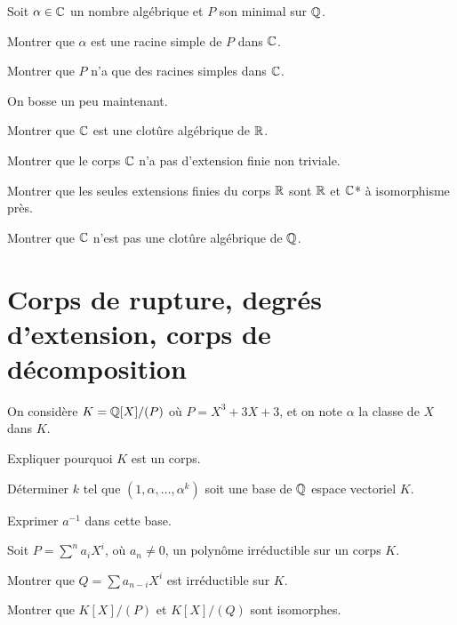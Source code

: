 \documentclass[french]{report}
\begin{document}
\begin{exo}
    Soit \(\alpha\in\mathbb{C}\) un nombre algébrique et \(P\) son
    minimal sur \(\mathbb{Q}\).
    \begin{q}{1}
        Montrer que \(\alpha\) est une racine simple de \(P\) dans \(\mathbb{C}\).
    \end{q}
    \begin{q}{2}
        Montrer que \(P\) n'a que des racines simples dans \(\mathbb{C}\).
    \end{q}
\end{exo}

\begin{exo} On bosse un peu maintenant.
    \begin{q}{1}
        Montrer que \(\mathbb{C}\) est une clotûre algébrique de \(\mathbb{R}\).
    \end{q}
    \begin{q}{2}
        Montrer que le corps \(\mathbb{C}\) n'a pas d'extension finie non triviale.
    \end{q}
    \begin{q}{3}
        Montrer que les seules extensions finies du corps \(\mathbb{R}\) sont \(\mathbb{R}\) et \(\mathbb{C}\)*
        à isomorphisme près.
    \end{q}
    \begin{q}{4}
        Montrer que \(\mathbb{C}\) n'est pas une clotûre algébrique de \(\mathbb{Q}\).
    \end{q}
\end{exo}

\section*{Corps de rupture, degrés d'extension, corps de décomposition}

\begin{exo}
    On considère \(K=\mathbb{Q}[X]/(P)\) où \(P=X^3+3X+3\), et on note \(\alpha\)
    la classe de \(X\) dans \(K\).
    \begin{q}{1}
        Expliquer pourquoi \(K\) est un corps.
    \end{q}
    \begin{q}{2}
        Déterminer \(k\) tel que \(\left(1,\alpha,\dots,\alpha^k\right)\) soit
        une base de \(\mathbb{Q}\) espace vectoriel \(K\).
    \end{q}
    \begin{q}{3}
        Exprimer \(a^{-1}\) dans cette base.
    \end{q}
\end{exo}

\begin{exo}
    Soit \(P=\sum^n a_iX^i\), où \(a_n\neq0\), un polynôme irréductible sur un corps \(K\).
    \begin{q}{1}
        Montrer que \(Q = \sum a_{n-i}X^i\) est irréductible sur \(K\).
    \end{q}
    \begin{q}{2}
        Montrer que \(K[X]/(P)\) et \(K[X]/(Q)\) sont isomorphes.
    \end{q}
\end{exo}
\end{document}
